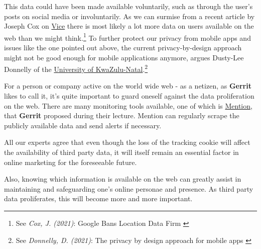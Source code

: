 This data could have been made available voluntarily, such as through the user's posts on social media or involuntarily. As we can surmise from a recent article by Joseph Cox on \href{https://www.vice.com/en}{Vice} there is most likely a lot more data on users available on the web than we might think.\footnote{See \textit{Cox, J. (2021)}: Google Bans Location Data Firm \cite{locationBan}} To further protect our privacy from mobile apps and issues like the one pointed out above, the current privacy-by-design approach might not be good enough for mobile applications anymore, argues Dusty-Lee Donnelly of the \href{https://ukzn.ac.za/}{University of KwaZulu-Natal}.\footnote{See \textit{Donnelly, D. (2021)}: The privacy by design approach for mobile apps \cite{privacyDesign}}

For a person or company active on the world wide web - as a netizen, as \textbf{Gerrit} likes to call it, it's quite important to guard oneself against the data proliferation on the web. There are many monitoring tools available, one of which is \href{https://mention.com/en/}{Mention}, that \textbf{Gerrit} proposed during their lecture. Mention can regularly scrape the publicly available data and send alerts if necessary. 

All our experts agree that even though the loss of the tracking cookie will affect the availability of third party data, it will itself remain an essential factor in online marketing for the foreseeable future. 

Also, knowing which information is available on the web can greatly assist in maintaining and safeguarding one's online personae and presence. As third party data proliferates, this will become more and more important.
